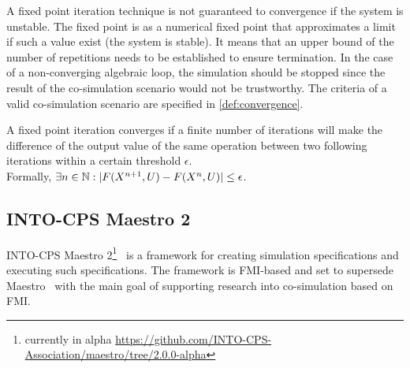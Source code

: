

A fixed point iteration technique is not guaranteed to convergence if the system is unstable. The fixed point is as a numerical fixed point that approximates a limit if such a value exist (the system is stable). It means that an upper bound of the number of repetitions needs to be established to ensure termination. In the case of a non-converging algebraic loop, the simulation should be stopped since the result of the co-simulation scenario would not be trustworthy. The criteria of a valid co-simulation scenario are specified in \cref{def:convergence}.

\begin{definition}\label{def:convergence}
A fixed point iteration converges if a finite number of iterations will make the difference of the output value of the same operation between two following iterations within a certain threshold $\epsilon$.\\
Formally, 
$\exists n \in \mathbb{N}: |F(X^{n+1}, U) - F(X^{n}, U)| \leq \epsilon$.
\end{definition}

\subsection{INTO-CPS Maestro 2}
INTO-CPS Maestro 2\footnote{currently in alpha \url{https://github.com/INTO-CPS-Association/maestro/tree/2.0.0-alpha}}~\cite{Thule2020a} is a framework for creating simulation specifications and executing such specifications. The framework is FMI-based and set to supersede Maestro~\cite{Maestro} with the main goal of supporting research into co-simulation based on FMI. 

